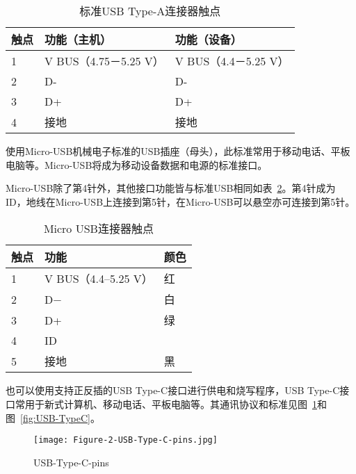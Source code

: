 \begin{table}[]
    \centering
    \begin{tabular}{@{}lll@{}}
    \toprule
    触点 & 功能（主机）             & 功能（设备）            \\ \midrule
    1  & V BUS（4.75－5.25 V） & V BUS（4.4－5.25 V） \\
    2  & D-                 & D-                \\
    3  & D+                 & D+                \\
    4  & 接地                 & 接地                \\ \bottomrule
    \end{tabular}
    \caption{标准USB Type-A连接器触点}
    \label{tab:USB-4}
\end{table}

使用Micro-USB机械电子标准的USB插座（母头），此标准常用于移动电话、平板电脑等。Micro-USB将成为移动设备数据和电源的标准接口。

Micro-USB除了第4针外，其他接口功能皆与标准USB相同如表~\ref{tab:MicroUSB}。第4针成为ID，地线在Micro-USB上连接到第5针，在Micro-USB可以悬空亦可连接到第5针。

\begin{table}[]
    \centering
    \begin{tabular}{@{}lll@{}}
    \toprule
    触点 & 功能                & 颜色 \\ \midrule
    1  & V BUS（4.4–5.25 V） & 红  \\
    2  & D−                & 白  \\
    3  & D+                & 绿  \\
    4  & ID                &    \\
    5  & 接地                & 黑 \\ \bottomrule
    \end{tabular}
    \caption{Micro USB连接器触点}
    \label{tab:MicroUSB}
\end{table}

也可以使用支持正反插的USB Type-C接口进行供电和烧写程序，USB Type-C接口常用于新式计算机、移动电话、平板电脑等。其通讯协议和标准见图~\ref{fig:USB-Type-C-pins}和图~\ref{fig:USB-TypeC}。

\begin{figure}[htbp]
    \centering
    \texttt{[image: Figure-2-USB-Type-C-pins.jpg]}
    \caption{USB-Type-C-pins}
    \label{fig:USB-Type-C-pins}
\end{figure}

